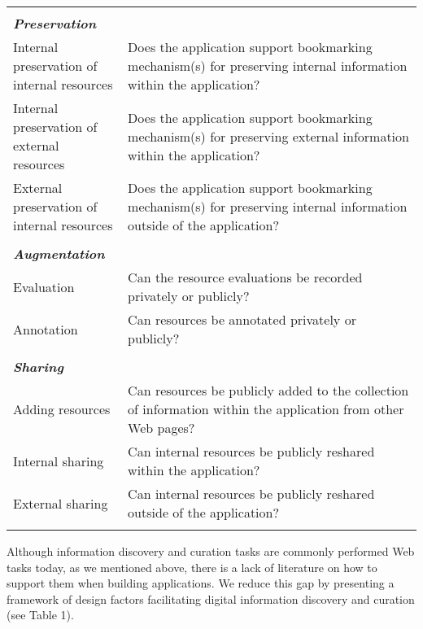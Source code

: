 \documentclass{casconpaper}
\begin{document}
{\begin{table*}[htbp]
\begin{tabular}{|p{0.28\linewidth}|p{0.72\linewidth}|}
&\\
\emph{\textbf{Preservation}}                   &                                                                                                           \\
Internal preservation of internal resources       & Does the application support bookmarking mechanism(s) for preserving internal information within the application?        \\
Internal preservation of external resources       & Does the application support bookmarking mechanism(s) for preserving external information within the application?        \\
External preservation of internal resources      & Does the application support bookmarking mechanism(s) for preserving internal information outside of the application? \\ 
&\\
\emph{\textbf{Augmentation}}            &                                                                                                           \\
Evaluation                   & Can the resource evaluations be recorded privately or publicly? \\
Annotation                   & Can resources be annotated privately or publicly?                                                                               \\    
&\\        
\emph{\textbf{Sharing}}            &                                                                                                           \\
Adding resources             & Can resources be publicly added to the collection of information within the application from other Web pages?     \\
Internal sharing         & Can internal resources be publicly reshared within the application?         \\ 
External sharing          & Can internal resources be publicly reshared outside of the application?         \\ 
&\\           
\hline
\end{tabular}
\end{table*}

Although information discovery and curation tasks are commonly performed Web tasks today, as we mentioned above, there is a lack of literature on how to support them when building applications. We reduce this gap by presenting a framework of design factors facilitating digital information discovery and curation (see Table 1). 

}
\end{document}
